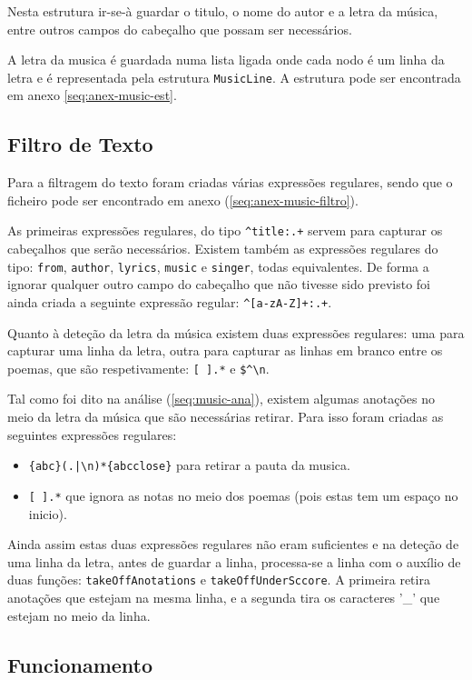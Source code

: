 Nesta estrutura ir-se-à guardar o titulo, o nome do autor e a letra da música, entre outros campos do cabeçalho que possam ser necessários.

A letra da musica é guardada numa lista ligada onde cada nodo é um linha da letra e é representada pela estrutura \verb!MusicLine!.
A estrutura pode ser encontrada em anexo \ref{seq:anex-music-est}.

\subsection{Filtro de Texto}
\label{seq:music-filtro}
Para a filtragem do texto foram criadas várias expressões regulares, sendo que o ficheiro pode ser encontrado em anexo (\ref{seq:anex-music-filtro}).

As primeiras expressões regulares, do tipo \verb!^title:.+! servem para capturar os cabeçalhos que serão necessários. Existem também as expressões regulares do tipo: \verb!from!, \verb!author!, \verb!lyrics!, \verb!music! e \verb!singer!, todas equivalentes. 
De forma a ignorar qualquer outro campo do cabeçalho que não tivesse sido previsto foi ainda criada a seguinte expressão regular: \verb!^[a-zA-Z]+:.+!.

Quanto à deteção da letra da música existem duas expressões regulares: uma para capturar uma linha da letra, outra para capturar as linhas em branco entre os poemas, que são respetivamente: \verb![ ].*! e \verb!$^\n!.

Tal como foi dito na análise (\ref{seq:music-ana}), existem algumas anotações no meio da letra da música que são necessárias retirar. Para isso foram criadas as seguintes expressões regulares:

\begin{itemize}
\item \verb!{abc}(.|\n)*{abcclose}! para retirar a pauta da musica.
\item \verb![ ].*! que ignora as notas no meio dos poemas (pois estas tem um espaço no inicio).
\end{itemize}

Ainda assim estas duas expressões regulares não eram suficientes e na deteção de uma linha da letra, antes de guardar a linha, processa-se a linha com o auxílio de duas funções: \verb!takeOffAnotations! e \verb!takeOffUnderSccore!. A primeira retira anotações que estejam na mesma linha, e a segunda tira os caracteres '\_'  que estejam no meio da linha.

\subsection{Funcionamento}
\label{seq:music-func}

